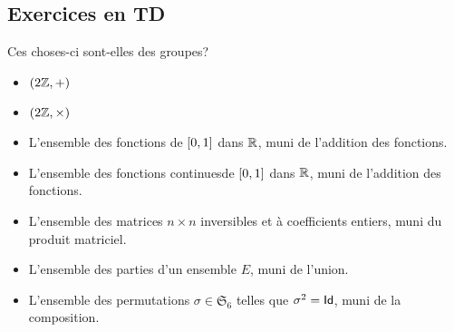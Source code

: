 \subsection*{Exercices en TD}\label{sec:tutorial_3}

\begin{td-exo}[Groupes] %
    Ces choses-ci sont-elles des groupes?
    \begin{itemize}
        \item \(\left(2\mathbb{Z},+\right)\)
        \item \(\left(2\mathbb{Z},\times\right)\)
        \item L'ensemble des fonctions de \(\mathopen{}\left[0,1\right]\mathclose{}\) dans \(\mathbb{R}\),
        muni de l'addition des fonctions.
        \item L'ensemble des fonctions continuesde \(\mathopen{}\left[0,1\right]\mathclose{}\) dans \(\mathbb{R}\),
        muni de l'addition des fonctions.
        \item L'ensemble des matrices \(n\times n\) inversibles et
        à coefficients entiers, muni du produit matriciel.
        \item L'ensemble des parties d'un ensemble \(E\), muni de
        l'union.
        \item L'ensemble des permutations \(\sigma\in\mathfrak{S}_6\)
        telles que \(\sigma^2=\operatorname{\mathsf{Id}}\), muni de la composition.
    \end{itemize}
\end{td-exo}
